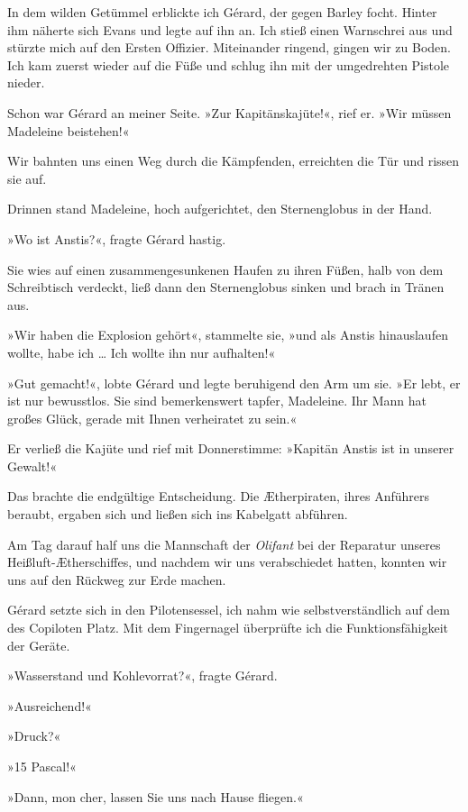 In dem wilden Getümmel erblickte ich Gérard, der gegen Barley
focht. Hinter ihm näherte sich Evans und legte auf ihn an. Ich
stieß einen Warnschrei aus und stürzte mich auf den Ersten
Offizier. Miteinander ringend, gingen wir zu Boden. Ich kam zuerst
wieder auf die Füße und schlug ihn mit der umgedrehten Pistole
nieder.

Schon war Gérard an meiner Seite. »Zur Kapitänskajüte!«, rief er.
»Wir müssen Madeleine beistehen!«

Wir bahnten uns einen Weg durch die Kämpfenden, erreichten die Tür
und rissen sie auf.

Drinnen stand Madeleine, hoch aufgerichtet, den Sternenglobus in
der Hand.

»Wo ist Anstis?«, fragte Gérard hastig.

Sie wies auf einen zusammengesunkenen Haufen zu ihren Füßen, halb
von dem Schreibtisch verdeckt, ließ dann den Sternenglobus sinken
und brach in Tränen aus.

»Wir haben die Explosion gehört«, stammelte sie, »und als Anstis
hinauslaufen wollte, habe ich \ldots{} Ich wollte ihn nur aufhalten!«

»Gut gemacht!«, lobte Gérard und legte beruhigend den Arm um sie.
»Er lebt, er ist nur bewusstlos. Sie sind bemerkenswert tapfer,
Madeleine. Ihr Mann hat großes Glück, gerade mit Ihnen verheiratet
zu sein.«

Er verließ die Kajüte und rief mit Donnerstimme: »Kapitän Anstis
ist in unserer Gewalt!«

Das brachte die endgültige Entscheidung. Die Ætherpiraten, ihres
Anführers beraubt, ergaben sich und ließen sich ins Kabelgatt
abführen.

\bigpar

Am Tag darauf half uns die Mannschaft der \emph{Olifant} bei der
Reparatur unseres Heißluft-Ætherschiffes, und nachdem wir uns
verabschiedet hatten, konnten wir uns auf den Rückweg zur Erde
machen.

Gérard setzte sich in den Pilotensessel, ich nahm wie
selbstverständlich auf dem des Copiloten Platz. Mit dem Fingernagel
überprüfte ich die Funktionsfähigkeit der Geräte.

»Wasserstand und Kohlevorrat?«, fragte Gérard.

»Ausreichend!«

»Druck?«

»15 Pascal!«

»Dann, mon cher, lassen Sie uns nach Hause fliegen.«

